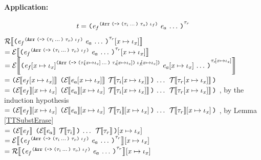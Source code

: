 \begin{sproof}
  \paragraph{Application:}
  \[\term =
  \notedapp[\type_r]{\annotate
    [\typearray{\typefun{\sequence{\type_i}}{\type_o}}{\idx_f}]
    {\expr_f}}{\sequence{\expr_a}}\]
  $\EraseTrm{\idxsubst{\notedapp[\type_r]{\annotate
        [\typearray{\typefun{\sequence{\type_i}}{\type_o}}{\idx_f}]
        {\expr_f}}{\sequence{\expr_a}}}}$ \\
  $= \EraseE{\idxsubst{\notedapp[\type_r]{\annotate
        [\typearray{\typefun{\sequence{\type_i}}{\type_o}}{\idx_f}]
        {\expr_f}}{\sequence{\expr_a}}}}$ \\
  $= \EraseE{\notedapp[\idxsubst{\type_r}]{\annotate
      [\typearray{\typefun{\sequence{\idxsubst{\type_i}}}{\idxsubst{\type_o}}}{\idxsubst{\idx_f}}]
      {\idxsubst{\expr_f}}}{\sequence{\idxsubst{\expr_a}}}}$ \\
  $= \app{\EraseE{\idxsubst{\expr_f}}}{\sequence
    {\ttsexp{\EraseE{\idxsubst{\expr_a}}}{\EraseT{\idxsubst{\type_i}}}}\;\EraseT{\idxsubst{\type_r}}}$ \\
  $= \app{\idxsubst{\EraseE{\expr_f}}}{\sequence
    {\ttsexp{\idxsubst{\EraseE{\expr_a}}}{\EraseT{\idxsubst{\type_i}}}}\;\EraseT{\idxsubst{\type_r}}}$%
  , by the induction hypothesis \\
  $= \app{\idxsubst{\EraseE{\expr_f}}}{\sequence
    {\ttsexp{\idxsubst{\EraseE{\expr_a}}}{\idxsubst{\EraseT{\type_i}}}}\;\idxsubst{\EraseT{\type_r}}}$%
  , by Lemma \ref{TTSubstErase} \\
  $= \idxsubst{\app{\EraseE{\expr_f}}{\sequence
      {\ttsexp{\EraseE{\expr_a}}{\EraseT{\type_i}}}\;\EraseT{\type_r}}}$ \\
  $= \idxsubst{\EraseE{\notedapp[\type_r]{\annotate
        [\typearray{\typefun{\sequence{\type_i}}{\type_o}}{\idx_f}]
        {\expr_f}}{\sequence{\expr_a}}}}$ \\
  $= \idxsubst{\EraseTrm{\notedapp[\type_r]{\annotate
        [\typearray{\typefun{\sequence{\type_i}}{\type_o}}{\idx_f}]
        {\expr_f}}{\sequence{\expr_a}}}}$ \\


\end{sproof}

